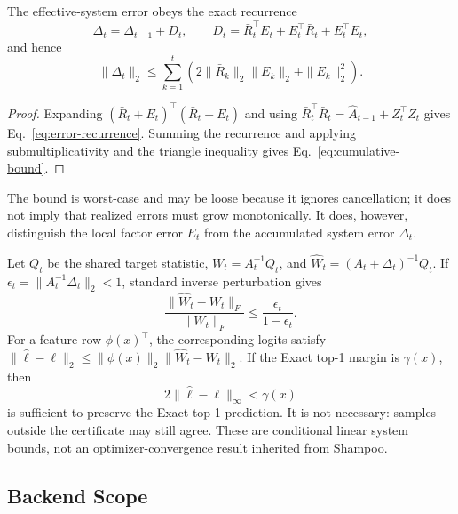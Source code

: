 \documentclass[runningheads]{llncs}
\begin{document}
\begin{proposition}
The effective-system error obeys the exact recurrence
\begin{equation}
\Delta_t=\Delta_{t-1}+D_t,\qquad
D_t=\bar R_t^\top E_t+E_t^\top\bar R_t+E_t^\top E_t,
\label{eq:error-recurrence}
\end{equation}
and hence
\begin{equation}
\|\Delta_t\|_2\le
\sum_{k=1}^{t}\left(
2\|\bar R_k\|_2\|E_k\|_2+\|E_k\|_2^2
\right).
\label{eq:cumulative-bound}
\end{equation}
\end{proposition}

\begin{proof}
Expanding $(\bar R_t+E_t)^\top(\bar R_t+E_t)$ and using
$\bar R_t^\top\bar R_t=\widehat A_{t-1}+Z_t^\top Z_t$ gives
Eq.~\ref{eq:error-recurrence}. Summing the recurrence and applying
submultiplicativity and the triangle inequality gives
Eq.~\ref{eq:cumulative-bound}.
\end{proof}

The bound is worst-case and may be loose because it ignores cancellation; it
does not imply that realized errors must grow monotonically. It does,
however, distinguish the local factor error $E_t$ from the accumulated system
error $\Delta_t$.

Let $Q_t$ be the shared target statistic, $W_t=A_t^{-1}Q_t$, and
$\widehat W_t=(A_t+\Delta_t)^{-1}Q_t$. If
$\epsilon_t=\|A_t^{-1}\Delta_t\|_2<1$, standard inverse perturbation gives
\begin{equation}
\frac{\|\widehat W_t-W_t\|_F}{\|W_t\|_F}
\le \frac{\epsilon_t}{1-\epsilon_t}.
\label{eq:ridge-perturbation}
\end{equation}
For a feature row $\phi(x)^\top$, the corresponding logits satisfy
$\|\widehat\ell-\ell\|_2\le
\|\phi(x)\|_2\|\widehat W_t-W_t\|_2$. If the Exact top-1 margin is
$\gamma(x)$, then
\begin{equation}
2\|\widehat\ell-\ell\|_\infty<\gamma(x)
\label{eq:margin-certificate}
\end{equation}
is sufficient to preserve the Exact top-1 prediction. It is not necessary:
samples outside the certificate may still agree. These are conditional linear
system bounds, not an optimizer-convergence result inherited from Shampoo.

\subsection{Backend Scope}
\end{document}
